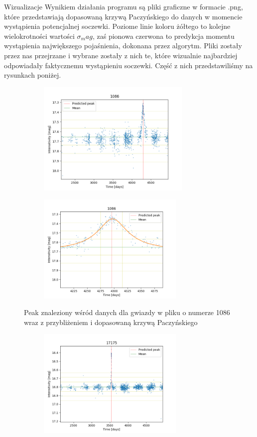 \documentclass[a4paper,11pt]{article}
\newcommand{\ak}{\hspace{0.7 cm}}
\begin{document}
\begin{subsection}{Wizualizacje}
	\ak Wynikiem działania programu są pliki graficzne w formacie .png, które przedstawiają dopasowaną krzywą Paczyńskiego do danych w momencie wystąpienia potencjalnej soczewki. Poziome linie koloru żółtego to kolejne wielokrotności wartości $\sigma_mag$, zaś pionowa czerwona to predykcja momentu wystąpienia największego pojaśnienia, dokonana przez algorytm. Pliki zostały przez nas przejrzane i wybrane zostały z nich te, które wizualnie najbardziej odpowiadały faktycznemu wystąpieniu soczewki. Część z nich przedstawiliśmy na rysunkach poniżej.
\begin{figure}[H]
\begin{subfigure}{0.5\textwidth}
\centering
\includegraphics[width=\linewidth,height=5.5cm]{1086.png}
\label{Fig_4}
\end{subfigure}
\begin{subfigure}{0.5\textwidth}
\centering
\includegraphics[width=\linewidth,height=5.25cm]{1086_v.png}
\label{Fig_5}
\end{subfigure}
\caption{Peak znaleziony wśród danych dla gwiazdy w pliku o numerze 1086 wraz z przybliżeniem i dopasowaną krzywą Paczyńskiego}
\end{figure}
\begin{figure}[H]
\begin{subfigure}{0.5\textwidth}
\centering
\includegraphics[width=\linewidth,height=5.25cm]{17175.png}

\end{subfigure}
\end{figure}
\end{subsection}
\end{document}
